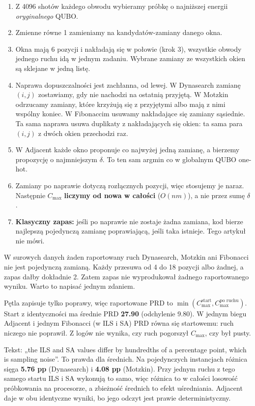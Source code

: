 \documentclass[11pt,a4paper]{article}
\newcommand{\Cmax}{C_{\max}}
\begin{document}
\begin{description}[leftmargin=0pt,style=nextline]
\item[F5. Od próbki do ruchu (R2.2), dokładnie według kodu.]
\begin{enumerate}[nosep]
\item Z 4096 shotów każdego obwodu wybieramy próbkę o najniższej energii \emph{oryginalnego} QUBO.
\item Zmienne równe 1 zamieniamy na kandydatów-zamiany danego okna.
\item Okna mają 6 pozycji i nakładają się w połowie (krok 3), wszystkie obwody jednego ruchu idą w jednym zadaniu. Wybrane zamiany ze wszystkich okien są sklejane w jedną listę.
\item Naprawa dopuszczalności jest zachłanna, od lewej. W Dynasearch zamianę $(i,j)$ zostawiamy, gdy nie nachodzi na ostatnią przyjętą. W Motzkin odrzucamy zamiany, które krzyżują się z przyjętymi albo mają z nimi wspólny koniec. W Fibonaccim usuwamy nakładające się zamiany sąsiednie. Ta sama naprawa usuwa duplikaty z nakładających się okien: ta sama para $(i,j)$ z dwóch okien przechodzi raz.
\item W Adjacent każde okno proponuje co najwyżej jedną zamianę, a bierzemy propozycję o najmniejszym $\delta$. To ten sam argmin co w globalnym QUBO one-hot.
\item Zamiany po naprawie dotyczą rozłącznych pozycji, więc stosujemy je naraz. Następnie $\Cmax$ \textbf{liczymy od nowa w całości} ($O(nm)$), a nie przez sumę $\delta$.
\item \textbf{Klasyczny zapas:} jeśli po naprawie nie zostaje żadna zamiana, kod bierze najlepszą pojedynczą zamianę poprawiającą, jeśli taka istnieje. Tego artykuł nie mówi.
\end{enumerate}
W surowych danych żaden raportowany ruch Dynasearch, Motzkin ani Fibonacci nie jest pojedynczą zamianą. Każdy przesuwa od 4 do 18 pozycji albo żadnej, a zapas dałby dokładnie 2. Zatem zapas nie wyprodukował żadnego raportowanego wyniku. Warto to napisać jednym zdaniem.

\item[F6. Raportowane PRD to najlepszy widziany $\Cmax$.]
Pętla zapisuje tylko poprawy, więc raportowane PRD to $\min(\Cmax^{\text{start}},\Cmax^{\text{po ruchu}})$. Start z identyczności ma średnie PRD \textbf{27.90} (odchylenie 9.80). W jednym biegu Adjacent i jednym Fibonacci (w ILS i SA) PRD równa się startowemu: ruch niczego nie poprawił. Z logów nie wynika, czy ruch pogorszył $\Cmax$, czy był pusty.

\item[F7. ILS i SA różnią się na instancjach bardziej, niż mówi tekst (R1.c).]
Tekst: „the ILS and SA values differ by hundredths of a percentage point, which is sampling noise”. To prawda dla średnich. Na pojedynczych instancjach różnica sięga \textbf{5.76 pp} (Dynasearch) i \textbf{4.08 pp} (Motzkin). Przy jednym ruchu z tego samego startu ILS i SA wykonują to samo, więc różnica to w całości losowość próbkowania na procesorze, a zbieżność średnich to efekt uśredniania. Adjacent daje w obu identyczne wyniki, bo jego odczyt jest prawie deterministyczny.


\end{description}
\end{document}

